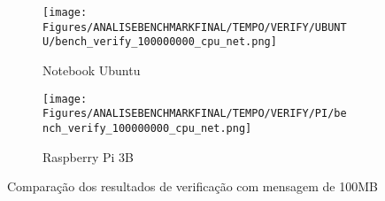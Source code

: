 \begin{figure}[h!]
    \centering
    \begin{subfigure}{1\textwidth}
        \texttt{[image: Figures/ANALISEBENCHMARKFINAL/TEMPO/VERIFY/UBUNTU/bench\_verify\_100000000\_cpu\_net.png]}
        \caption{Notebook Ubuntu}
    \end{subfigure}
    \par\vspace{1em}
    \begin{subfigure}{1\textwidth}
        \texttt{[image: Figures/ANALISEBENCHMARKFINAL/TEMPO/VERIFY/PI/bench\_verify\_100000000\_cpu\_net.png]}
        \caption{Raspberry Pi 3B}
    \end{subfigure}
    \caption{Comparação dos resultados de verificação com mensagem de 100MB}
    \label{fig:BENCHFINAL_VERIFY100MB_TIME}
\end{figure}

